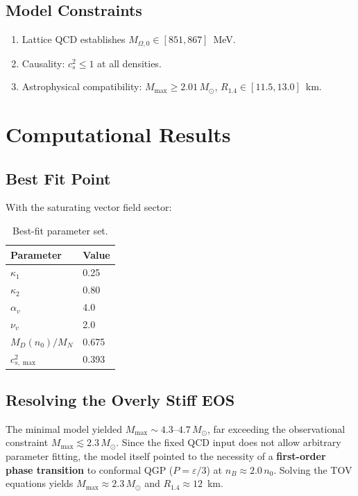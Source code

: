 \documentclass[11pt,a4paper]{article}
\begin{document}
\subsection{Model Constraints}

\begin{enumerate}
\item Lattice QCD establishes $M_{\Omega,0} \in [851, 867]$~MeV.
\item Causality: $c_s^2 \le 1$ at all densities.
\item Astrophysical compatibility: $M_{\max} \geq 2.01\,M_\odot$, $R_{1.4} \in [11.5, 13.0]$~km.
\end{enumerate}

\section{Computational Results}
\label{sec:results}

\subsection{Best Fit Point}

With the saturating vector field sector:

\begin{table}[h]
\centering
\begin{tabular}{ll}
\toprule
Parameter & Value \\
\midrule
$\kappa_1$ & 0.25 \\
$\kappa_2$ & 0.80 \\
$\alpha_v$ & 4.0 \\
$\nu_v$ & 2.0 \\
$M_D(n_0)/M_N$ & 0.675 \\
$c_{s,\max}^2$ & 0.393 \\
\bottomrule
\end{tabular}
\caption{Best-fit parameter set.}
\label{tab:bestfit}
\end{table}

\subsection{Resolving the Overly Stiff EOS}

The minimal model yielded $M_{\max} \sim 4.3\text{--}4.7\,M_\odot$, far exceeding the observational constraint $M_{\max} \lesssim 2.3\,M_\odot$. Since the fixed QCD input does not allow arbitrary parameter fitting, the model itself pointed to the necessity of a \textbf{first-order phase transition} to conformal QGP ($P = \varepsilon/3$) at $n_B \approx 2.0\,n_0$. Solving the TOV equations yields $M_{\max} \approx 2.3\,M_\odot$ and $R_{1.4} \approx 12$~km.
\end{document}
